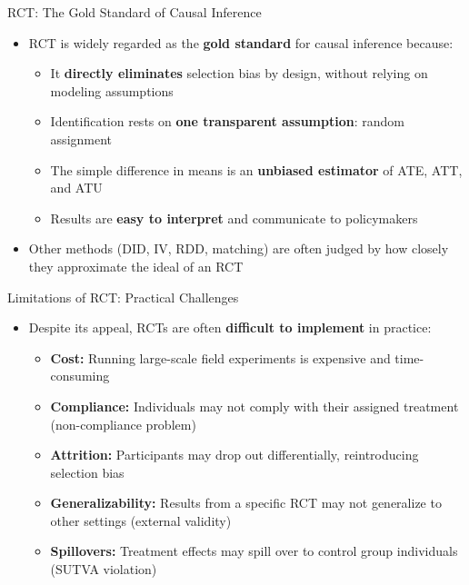 \documentclass[hyperref={pdfpagelabels=false}]{beamer}
\begin{document}
	\begin{frame}{RCT: The Gold Standard of Causal Inference}
		\begin{itemize}
			\item RCT is widely regarded as the \textbf{gold standard} for causal inference because:
			\vspace{0.2cm}
			\begin{itemize}
				\item It \textbf{directly eliminates} selection bias by design, without relying on modeling assumptions
				\vspace{0.2cm}
				\item Identification rests on \textbf{one transparent assumption}: random assignment
				\vspace{0.2cm}
				\item The simple difference in means is an \textbf{unbiased estimator} of ATE, ATT, and ATU
				\vspace{0.2cm}
				\item Results are \textbf{easy to interpret} and communicate to policymakers
			\end{itemize}
			\vspace{0.3cm}
			\item Other methods (DID, IV, RDD, matching) are often judged by how closely they approximate the ideal of an RCT
		\end{itemize}
	\end{frame}
	
	\begin{frame}{Limitations of RCT: Practical Challenges}
		\begin{itemize}
			\item Despite its appeal, RCTs are often \textbf{difficult to implement} in practice:
			\vspace{0.2cm}
			\begin{itemize}
				\item \textbf{Cost:} Running large-scale field experiments is expensive and time-consuming
				\vspace{0.2cm}
				\item \textbf{Compliance:} Individuals may not comply with their assigned treatment (non-compliance problem)
				\vspace{0.2cm}
				\item \textbf{Attrition:} Participants may drop out differentially, reintroducing selection bias
				\vspace{0.2cm}
				\item \textbf{Generalizability:} Results from a specific RCT may not generalize to other settings (external validity)
				\vspace{0.2cm}
				\item \textbf{Spillovers:} Treatment effects may spill over to control group individuals (SUTVA violation)
			\end{itemize}
		\end{itemize}
	\end{frame}
	
\end{document}
